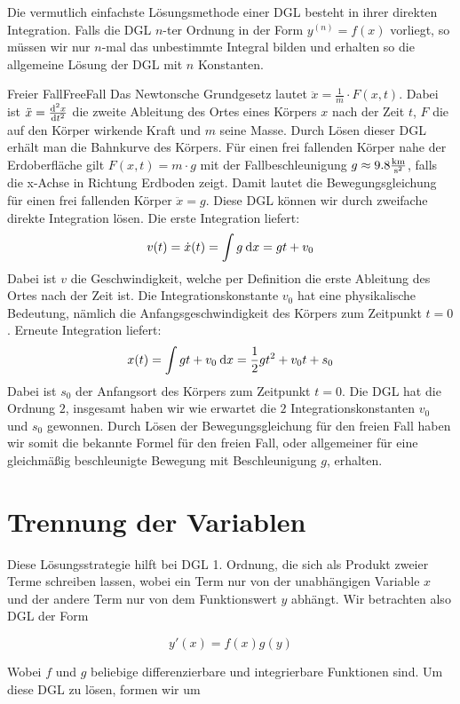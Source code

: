 Die vermutlich einfachste Lösungsmethode einer DGL besteht in ihrer direkten Integration. Falls die DGL $n$-ter Ordnung in der Form $y^{(n)} = f(x)$ vorliegt, so müssen wir nur $n$-mal das unbestimmte Integral bilden und erhalten so die allgemeine Lösung der DGL mit $n$ Konstanten.

\begin{example}{Freier Fall}{FreeFall}
    Das Newtonsche Grundgesetz lautet $\ddot{x} = \frac{1}{m}\cdot F(x,t)$. Dabei ist $\ddot{x} = \frac{\mathrm{d}^{2}{x}}{\mathrm{d}{t^{2}}}$ die zweite Ableitung des Ortes eines Körpers $x$ nach der Zeit $t$, $F$ die auf den Körper wirkende Kraft und $m$ seine Masse. Durch Lösen dieser DGL erhält man die Bahnkurve des Körpers. Für einen frei fallenden Körper nahe der Erdoberfläche gilt $F(x,t)=m \cdot g$ mit der Fallbeschleunigung $g\approx 9.8\frac{\text{km}}{\text{s}^2}$, falls die x-Achse in Richtung Erdboden zeigt. Damit lautet die Bewegungsgleichung für einen frei fallenden Körper $\ddot{x} = g$. Diese DGL können wir durch zweifache direkte Integration lösen. Die erste Integration liefert:
    $$
        v(t) = \dot{x}(t) = \int g \:\mathrm{d}{x} = gt +v_0
    $$
    Dabei ist $v$ die Geschwindigkeit, welche per Definition die erste Ableitung des Ortes nach der Zeit ist. Die Integrationskonstante $v_0$ hat eine physikalische Bedeutung, nämlich die Anfangsgeschwindigkeit des Körpers zum Zeitpunkt $t=0$. Erneute Integration liefert:
    $$
        x(t) = \int gt + v_0 \:\mathrm{d}{x} = \frac{1}{2} g t^2 + v_0 t + s_0
    $$
    Dabei ist $s_0$ der Anfangsort des Körpers zum Zeitpunkt $t=0$. Die DGL hat die Ordnung $2$, insgesamt haben wir wie erwartet die $2$ Integrationskonstanten $v_0$ und $s_0$ gewonnen. Durch Lösen der Bewegungsgleichung für den freien Fall haben wir somit die bekannte Formel für den freien Fall, oder allgemeiner für eine gleichmäßig beschleunigte Bewegung mit Beschleunigung $g$, erhalten.
\end{example}

\section{Trennung der Variablen}

Diese Lösungsstrategie hilft bei DGL 1. Ordnung, die sich als Produkt zweier Terme schreiben lassen, wobei ein Term nur von der unabhängigen Variable $x$ und der andere Term nur von dem Funktionswert $y$ abhängt. Wir betrachten also DGL der Form

$$
   y'(x) = f(x) g(y)
$$

Wobei $f$ und $g$ beliebige differenzierbare und integrierbare Funktionen sind. Um diese DGL zu lösen, formen wir um

